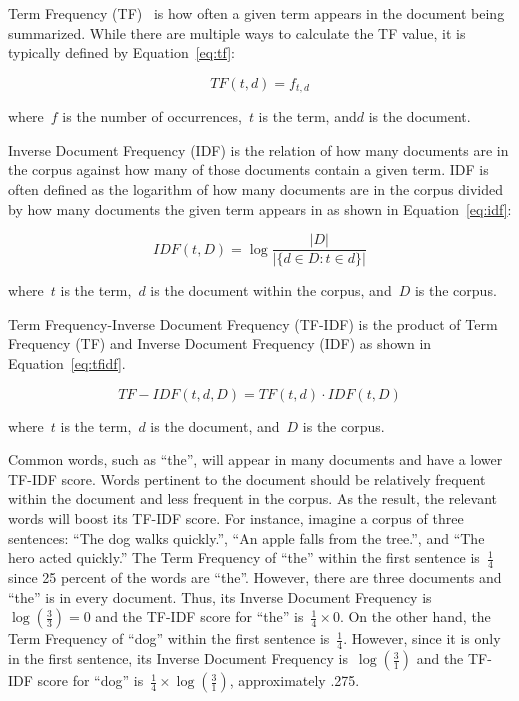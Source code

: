 \documentclass{article}[10]
\begin{document}
Term Frequency (TF)~\cite{Leskovec} is how often a given term appears in the document being summarized. While there are multiple ways to calculate the TF value, it is typically defined by Equation~\eqref{eq:tf}:

\begin{equation}
  TF(t, d) = f_{t, d} \label{eq:tf}
\end{equation}

where~\(f\) is the number of occurrences,~\(t\) is the term, and\(d\) is the document.

Inverse Document Frequency (IDF) is the relation of how many documents are in the corpus against how many of those documents contain a given term. IDF is often defined as the logarithm of how many documents are in the corpus divided by how many documents the given term appears in as shown in Equation~\eqref{eq:idf}:

\begin{equation}
  IDF(t, D) = \log\frac{|D|}{|\{d \in D : t \in d\}|} \label{eq:idf}
\end{equation}

where~\(t\) is the term,~\(d\) is the document within the corpus, and~\(D\) is the corpus.

Term Frequency-Inverse Document Frequency (TF-IDF) is the product of Term Frequency (TF) and Inverse Document Frequency (IDF) as shown in Equation~\eqref{eq:tfidf}.

\begin{equation}
  TF-IDF(t, d, D) = TF(t, d) \cdot IDF(t, D) \label{eq:tfidf}
\end{equation}

where~\(t\) is the term,~\(d\) is the document, and~\(D\) is the corpus.

Common words, such as ``the'', will appear in many documents and have a lower TF-IDF score. Words pertinent to the document should be relatively frequent within the document and less frequent in the corpus. As the result, the relevant words will boost its TF-IDF score. For instance, imagine a corpus of three sentences: ``The dog walks quickly.'', ``An apple falls from the tree.'', and ``The hero acted quickly.'' The Term Frequency of ``the'' within the first sentence is~\(\frac{1}{4}\) since 25 percent of the words are ``the''. However, there are three documents and ``the'' is in every document. Thus, its Inverse Document Frequency is~\( \log(\frac{3}{3}) = 0 \) and the TF-IDF score for ``the'' is~\(\frac{1}{4} \times 0\). On the other hand, the Term Frequency of ``dog'' within the first sentence is~\(\frac{1}{4}\). However, since it is only in the first sentence, its Inverse Document Frequency is~\(\log(\frac{3}{1})\) and the TF-IDF score for ``dog'' is~\(\frac{1}{4} \times \log(\frac{3}{1})\), approximately .275.
\end{document}
